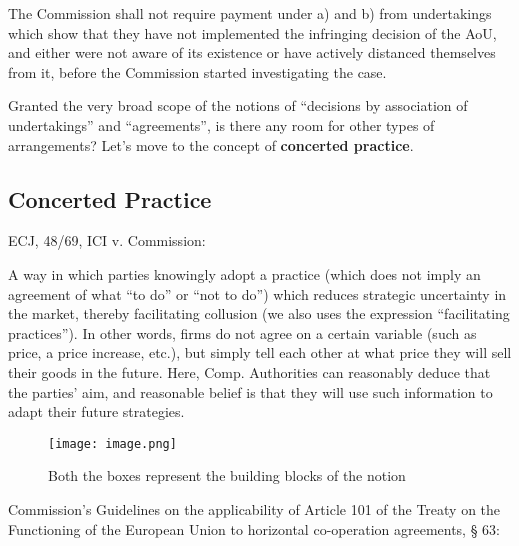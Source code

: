             The Commission shall not require payment under a) and b) from undertakings which show that they have not implemented the infringing decision of the AoU, and either were not aware of its existence or have actively distanced themselves from it, before the Commission started investigating the case.


            Granted the very broad scope of the notions of “decisions by association of undertakings” and “agreements”, is there any room for other types of arrangements? Let's move to the concept of \textbf{concerted practice}.

\newpage

    \subsection{Concerted Practice}

            ECJ, 48/69, ICI v. Commission:


            A way in which parties knowingly adopt a practice (which does not imply an agreement of what “to do” or “not to do”) which reduces strategic uncertainty in the market, thereby facilitating collusion (we also uses the expression “facilitating practices”). In other words, firms do not agree on a certain variable (such as price, a price increase, etc.), but simply tell each other at what price they will sell their goods in the future. Here, Comp. Authorities can reasonably deduce that the parties’ aim, and reasonable belief is that they will use such information to adapt their future strategies.

            \begin{figure}[h]
                \centering
                \texttt{[image: image.png]}
                \caption{Both the boxes represent the building blocks of the notion}
            \end{figure}

            Commission’s Guidelines on the applicability of Article 101 of the Treaty on the Functioning of the European Union to horizontal co-operation agreements, § 63:

